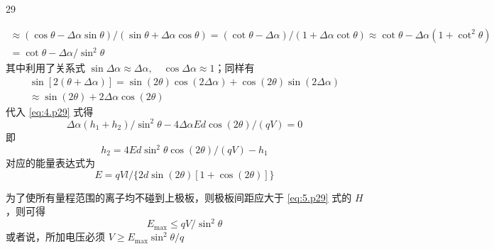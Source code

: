 \begin{solution}{29}
\begin{subsolution}
\begin{equation}
\begin{array}{l}
        \approx (\cos \theta - \Delta \alpha \sin \theta) / (\sin \theta + \Delta \alpha \cos \theta) = (\cot \theta - \Delta \alpha) / (1 + \Delta \alpha \cot \theta) \approx \cot \theta - \Delta \alpha (1 + \cot^{2} \theta) \\
        = \cot \theta - \Delta \alpha / \sin^{2} \theta
      \end{array}
    \end{equation}
    其中利用了关系式 $\sin\Delta\alpha\approx\Delta\alpha,\quad\cos\Delta\alpha\approx1$；同样有
    \begin{equation}
      \begin{array}{l}
        \sin [ 2 (\theta + \Delta \alpha) ] = \sin (2 \theta) \cos (2 \Delta \alpha) + \cos (2 \theta) \sin (2 \Delta \alpha) \\
        \approx \sin (2 \theta) + 2 \Delta \alpha \cos (2 \theta)
      \end{array}
    \end{equation}
    代入 \eqref{eq:4.p29} 式得
    \begin{equation}
      \Delta \alpha (h_{1} + h_{2}) / \sin^{2} \theta - 4 \Delta \alpha E d \cos (2 \theta) / (q V) = 0
    \end{equation}
    即
    \begin{equation}
      h_{2} = 4 E d \sin^{2} \theta \cos (2 \theta) / (q V) - h_{1}
      \label{eq:7.p29}
    \end{equation}
    对应的能量表达式为
    \begin{equation}
      E = q V l / \{2 d \sin (2 \theta) [ 1 + \cos (2 \theta) ] \}
      \label{eq:8.p29}
    \end{equation}
  \end{subsolution}
  \begin{subsolution}
    为了使所有量程范围的离子均不碰到上极板，则极板间距应大于 \eqref{eq:5.p29} 式的 $H$，则可得
    \begin{equation}
      E_{\max} \leq q V / \sin^{2} \theta
      \label{eq:9.p29}
    \end{equation}
    或者说，所加电压必须 $V \geq E_{\max} \sin^{2} \theta / q$


\end{subsolution}
\end{solution}
